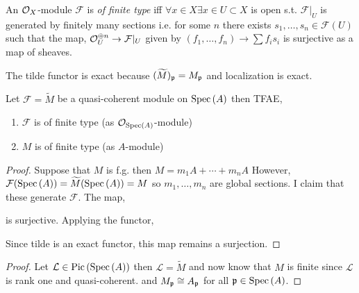 \documentclass[12pt]{article}
\begin{document}
\begin{definition}
An $\mathcal{O}_{X}$-module $\mathcal{F}$ is \textit{of finite type} iff $\forall x \in X \exists x \in U \subset X$ is open s.t. $\mathcal{F}|_U$ is generated by finitely many sections i.e. for some $n$ there exists $s_1, \dots, s_n \in \mathcal{F}(U)$ such that the map, $\mathcal{O}_{U}^{\oplus n} \to \mathcal{F}|_U $ given by $(f_1, \dots, f_n) \to \sum f_i s_i$ is surjective as a map of sheaves. 
\end{definition}

\begin{lemma}
The tilde functor is exact because $(\widetilde{M})_{\mathfrak{p}} = M_{\mathfrak{p}}$ and localization is exact. 
\end{lemma}

\begin{lemma}
Let $\mathcal{F} = \widetilde{M}$ be a quasi-coherent module on $\mathrm{Spec}\left( A \right)$ then TFAE,
\begin{enumerate}
\item $\mathcal{F}$ is of finite type (as $\mathcal{O}_{\mathrm{Spec}\left( A \right)}$-module)
\item $M$ is of finite type (as $A$-module)
\end{enumerate}
\end{lemma}

\begin{proof}
Suppose that $M$ is f.g. then $M = m_1 A + \cdots + m_n A$ However, $\mathcal{F}(\mathrm{Spec}\left( A \right)) = \widetilde{M}(\mathrm{Spec}\left( A \right)) = M$ so $m_1, \dots, m_n$ are global sections. I claim that these generate $\mathcal{F}$. The map,
\begin{center}
\end{center}
is surjective. Applying the functor,
\begin{center}
\end{center}
Since tilde is an exact functor, this map remains a surjection. 
\end{proof}

\begin{proposition}

\end{proposition}

\begin{proof}
Let $\mathcal{L} \in \mathrm{Pic} \left( \mathrm{Spec}\left( A \right) \right)$ then $\mathcal{L} = \widetilde{M}$ and now know that $M$ is finite since $\mathcal{L}$ is rank one and quasi-coherent. and $M_{\mathfrak{p}} \cong A_{\mathfrak{p}}$ for all $\mathfrak{p} \in \mathrm{Spec}\left( A \right)$. 
\end{proof}
\end{document}
